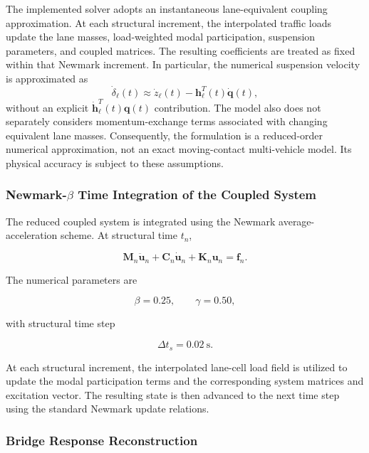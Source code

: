 \documentclass[journal]{IEEEtran}
\begin{document}
The implemented solver adopts an instantaneous lane-equivalent
coupling approximation. At each structural increment, the
interpolated traffic loads update the lane masses, load-weighted
modal participation, suspension parameters, and coupled matrices.
The resulting coefficients are treated as fixed within that
Newmark increment. In particular, the numerical suspension
velocity is approximated as
\begin{equation}
\dot{\delta}_{\ell}(t)\approx
\dot{z}_{\ell}(t)-
\mathbf{h}_{\ell}^{T}(t)\dot{\mathbf{q}}(t),
\label{eq:reduced_velocity_approx}
\end{equation}
without an explicit
$\dot{\mathbf{h}}_{\ell}^{T}(t)\mathbf{q}(t)$ contribution.
The model also does not separately considers momentum-exchange
terms associated with changing equivalent lane masses.
Consequently, the formulation is a reduced-order numerical
approximation, not an exact moving-contact multi-vehicle model.
Its physical accuracy is subject to these assumptions.


\subsubsection{Newmark-$\beta$ Time Integration of the Coupled System}

The reduced coupled
system is integrated using the Newmark average-acceleration scheme. At
structural time $t_n$,

\begin{equation}
\mathbf{M}_n\ddot{\mathbf{u}}_n
+
\mathbf{C}_n\dot{\mathbf{u}}_n
+
\mathbf{K}_n\mathbf{u}_n
=
\mathbf{f}_n.
\end{equation}

The numerical
parameters are

\begin{equation}
\beta = 0.25,
\qquad
\gamma = 0.50,
\end{equation}

with structural time
step

\begin{equation}
\Delta t_s = 0.02~\mathrm{s}.
\end{equation}

At each structural
increment, the interpolated lane-cell load field is utilized to update the
modal participation terms and the corresponding system matrices and excitation
vector. The resulting state is then advanced to the next time step using the
standard Newmark update relations.


\subsubsection{Bridge Response Reconstruction}
\end{document}

